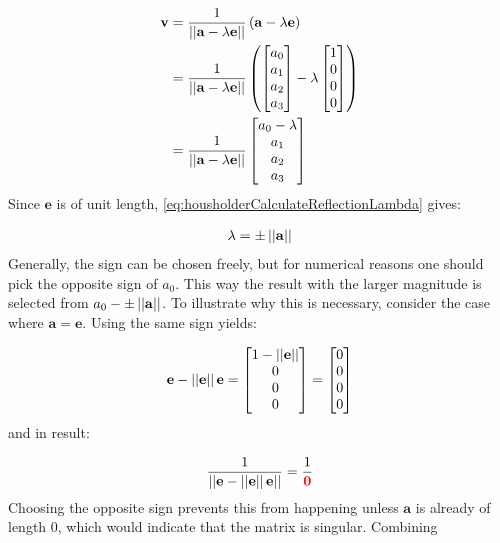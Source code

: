 \begin{align}
\mathbf{v} 
&= 
\frac{1}{\left\vert\left\vert\mathbf{a} - \lambda \mathbf{e}\right\vert\right\vert}\left(\mathbf{a} - \lambda \mathbf{e}\right)\\
&=
\frac{1}{\left\vert\left\vert\mathbf{a} - \lambda \mathbf{e}\right\vert\right\vert}
\left(
\begin{bmatrix}
a_0\\
a_1\\
a_2\\
a_3
\end{bmatrix}
-	
\lambda	
\begin{bmatrix}
1\\
0\\
0\\
0
\end{bmatrix}
\right)\\
\label{eq:qrReflectionVector0StillContainingLambda}
&=
\frac{1}{\left\vert\left\vert\mathbf{a} - \lambda \mathbf{e}\right\vert\right\vert}
\begin{bmatrix}
a_0 - \lambda\\
a_1\\
a_2\\
a_3
\end{bmatrix}
\end{align}
%
Since $\mathbf{e}$ is of unit length, \cref{eq:housholderCalculateReflectionLambda} gives:

\begin{align}
\lambda = \pm \left\vert\left\vert\mathbf{a}\right\vert\right\vert
\end{align}
%
Generally, the sign can be chosen freely, but for numerical reasons one should pick the opposite sign of $a_0$. 
This way the result with the larger magnitude is selected from $a_0 -  \pm \left\vert\left\vert\mathbf{a}\right\vert\right\vert$.
To illustrate why this is necessary, consider the case where $\mathbf{a} = \mathbf{e}$.
Using the same sign yields:

\begin{align}
\mathbf{e} - \left\vert\left\vert\mathbf{e}\right\vert\right\vert\mathbf{e} 
=
\begin{bmatrix}
1 - \left\vert\left\vert\mathbf{e}\right\vert\right\vert\\
0\\
0\\
0
\end{bmatrix}
=
\begin{bmatrix}
0\\
0\\
0\\
0 
\end{bmatrix}
\end{align}
%
and in result:

\begin{align}
\frac{1}{\left\vert\left\vert\mathbf{e} - \left\vert\left\vert\mathbf{e}\right\vert\right\vert\mathbf{e}\right\vert\right\vert} = \frac{1}{\color{red}{\mathbf{0}}}
\end{align}
%
Choosing the opposite sign prevents this from happening unless $\mathbf{a}$ is already of length 0, which would indicate that the matrix is singular.
Combining 


